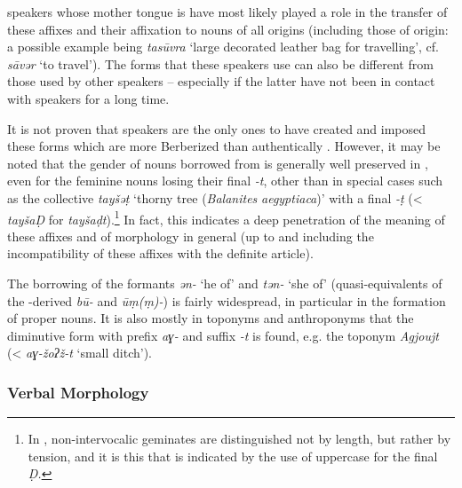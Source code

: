 \documentclass[output=paper]{langsci/langscibook}
\begin{document}
 speakers whose mother tongue is  have most likely played a role in the {transfer} of these affixes and their affixation to nouns of all origins (including those of  origin: a possible example being \textit{tasūvra} ‘large decorated leather bag for travelling’, cf. \textit{sāvər} ‘to travel’). The forms that these speakers use can also be different from those used by other  speakers – especially if the latter have not been in contact with  speakers for a long time. 

It is not proven that  speakers are the only ones to have created and imposed these forms which are more Berberized than authentically . However, it may be noted that the {gender} of nouns borrowed from  is generally well preserved in , even for the feminine nouns losing their final \textit{{}-t}, other than in special cases such as the {collective} \textit{tayšəṭ} ‘thorny tree (\textit{Balanites} \textit{aegyptiaca})’ with a final \textit{{}-ṭ} (<  \textit{tayšaḌ} for \textit{tayšaḍt}).\footnote{In , non-intervocalic geminates are distinguished not by length, but rather by tension, and it is this that is indicated by the use of uppercase for the final \textit{Ḍ.} } In fact, this indicates a deep penetration of the meaning of these affixes and of  morphology in general (up to and including the incompatibility of these affixes with the {definite} {article}). 

The borrowing of the formants \textit{ən-} ‘he of’ and \textit{tən-} ‘she of’ (quasi-equivalents of the -derived \textit{bū-} and \textit{ūṃ(ṃ)-}) is fairly widespread, in particular in the {formation} of proper nouns. It is also mostly in toponyms and anthroponyms that the {diminutive} form with prefix \textit{aɣ-} and suffix \textit{{}-t} is found, e.g. the toponym \textit{Agjoujt} (< \textit{aɣ-žoʔž-t} ‘small ditch’).

\subsubsection{Verbal Morphology} %

\label{sa}
\end{document}
